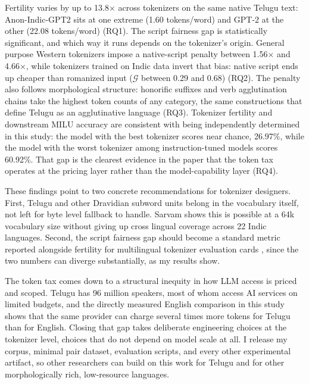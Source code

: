 ﻿\documentclass[11pt]{article}
\begin{document}
Fertility varies by up to 13.8$\times$ across tokenizers on the same
native Telugu text: Anon-Indic-GPT2 sits at one extreme (1.60
tokens/word) and GPT-2 at the other (22.08 tokens/word) (RQ1). The
script fairness gap is statistically significant, and which way it
runs depends on the tokenizer's origin. General purpose Western
tokenizers impose a native-script penalty between 1.56$\times$ and
4.66$\times$, while tokenizers trained on Indic data invert that
bias: native script ends up cheaper than romanized input
($\mathcal{G}$ between 0.29 and 0.68) (RQ2). The penalty also
follows morphological
structure: honorific suffixes and verb agglutination chains take
the highest token counts of any category, the same constructions
that define Telugu as an agglutinative language (RQ3). Tokenizer fertility and downstream MILU accuracy are consistent
with being independently determined in this study: the model with
the best tokenizer scores near chance, 26.97\%, while the model
with the worst tokenizer among instruction-tuned models scores
60.92\%. That gap is the clearest evidence in the paper that the
token tax operates at the pricing layer rather than the
model-capability layer (RQ4).

These findings point to two concrete recommendations for tokenizer
designers. First, Telugu and other Dravidian subword units belong
in the vocabulary itself, not left for byte level fallback to
handle. Sarvam shows this is possible at a 64k vocabulary size
without giving up cross lingual coverage across 22 Indic languages.
Second, the script fairness gap should become a standard metric
reported alongside fertility for multilingual tokenizer evaluation cards
\citep{rust-etal-2021-how, petrov-etal-2023-language}, since the two
numbers can diverge substantially, as my results show.

The token tax comes down to a structural inequity in how LLM access
is priced and scoped. Telugu has 96 million speakers, most of whom
access AI services on limited budgets, and the directly measured
English comparison in this study shows that the same provider can
charge several times more tokens for Telugu than for English.
Closing that gap takes deliberate engineering choices at the
tokenizer level, choices that do not depend on model scale at all.
I release my corpus, minimal pair dataset, evaluation scripts, and
every other experimental artifact, so other researchers can build on
this work for Telugu and for other morphologically rich, low-resource
languages.

%


\appendix
\end{document}
